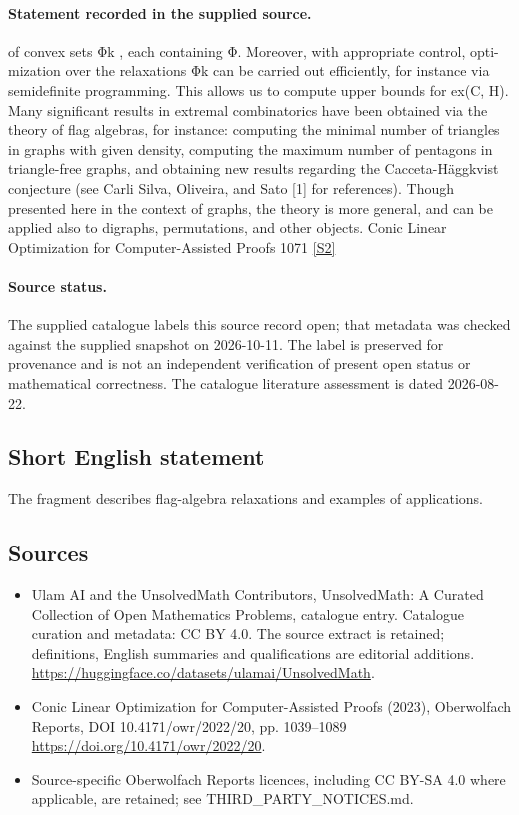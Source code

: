 \documentclass[11pt]{article}
\begin{document}
\paragraph{Statement recorded in the supplied source.}
of convex sets Φk , each containing Φ. Moreover, with appropriate control, opti- mization over the relaxations Φk can be carried out efficiently, for instance via semidefinite programming. This allows us to compute upper bounds for ex(C, H). Many significant results in extremal combinatorics have been obtained via the theory of flag algebras, for instance: computing the minimal number of triangles in graphs with given density, computing the maximum number of pentagons in triangle-free graphs, and obtaining new results regarding the Cacceta-Häggkvist conjecture (see Carli Silva, Oliveira, and Sato [1] for references). Though presented here in the context of graphs, the theory is more general, and can be applied also to digraphs, permutations, and other objects. Conic Linear Optimization for Computer-Assisted Proofs 1071 \href{https://doi.org/10.4171/owr/2022/20}{[S2]}
\paragraph{Source status.}
The supplied catalogue labels this source record open; that metadata was checked against the supplied snapshot on 2026-10-11. The label is preserved for provenance and is not an independent verification of present open status or mathematical correctness. The catalogue literature assessment is dated 2026-08-22.
\subsection{Short English statement}
The fragment describes flag-algebra relaxations and examples of applications.
\subsection{Sources}
\begin{itemize}
\item[S1] Ulam AI and the UnsolvedMath Contributors, UnsolvedMath: A Curated Collection of Open Mathematics Problems, catalogue entry. Catalogue curation and metadata: CC BY 4.0. The source extract is retained; definitions, English summaries and qualifications are editorial additions.
\url{https://huggingface.co/datasets/ulamai/UnsolvedMath}.
\item[S2] Conic Linear Optimization for Computer-Assisted Proofs (2023), Oberwolfach Reports, DOI 10.4171/owr/2022/20, pp. 1039--1089
\url{https://doi.org/10.4171/owr/2022/20}.
\item Source-specific Oberwolfach Reports licences, including CC BY-SA 4.0 where applicable, are retained; see THIRD\_PARTY\_NOTICES.md.
\end{itemize}
\end{document}
